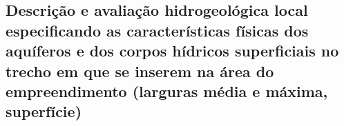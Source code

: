 \subsection{Descrição e avaliação hidrogeológica local especificando as características físicas dos aquíferos e dos corpos hídricos superficiais no trecho em que se inserem na área do empreendimento (larguras média e máxima, superfície)}
